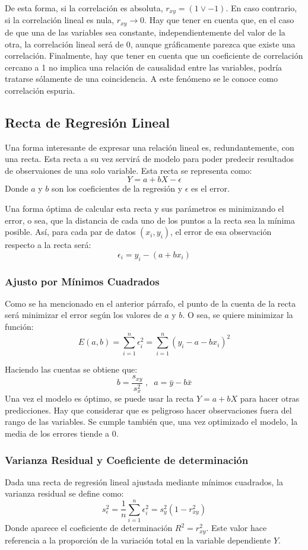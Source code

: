\documentclass[10pt,a4paper]{book}
\begin{document}
De esta forma, si la correlación es absoluta, $r_{xy} = (1 \lor -1)$. En caso contrario, si la correlación lineal es nula, $r_{xy}\to 0$. Hay que tener en cuenta que, en el caso de que una de las variables sea constante, independientemente del valor de la otra, la correlación lineal será de 0, aunque gráficamente parezca que existe una correlación. Finalmente, hay que tener en cuenta que un coeficiente de correlación cercano a 1 no implica una relación de causalidad entre las variables, podría tratarse sólamente de una coincidencia. A este fenómeno se le conoce como correlación espuria.

\subsection{Recta de Regresión Lineal}
Una forma interesante de expresar una relación lineal es, redundantemente, con una recta. Esta recta a su vez servirá de modelo para poder predecir resultados de observaiones de una solo variable. Esta recta se representa como:
\[Y=a+bX-\epsilon\]
Donde $a$ y $b$ son los coeficientes de la regresión y $\epsilon$ es el error.

Una forma óptima de calcular esta recta y sus parámetros es minimizando el error, o sea, que la distancia de cada uno de los puntos a la recta sea la mínima posible. Así, para cada par de datos $(x_i,y_i)$, el error de esa observación respecto a la recta será:
\[\epsilon_i = y_i-(a+bx_i)\]

\subsubsection{Ajusto por Mínimos Cuadrados}
Como se ha mencionado en el anterior párrafo, el punto de la cuenta de la recta será minimizar el error según los valores de $a$ y $b$. O sea, se quiere minimizar la función:
\[E(a,b) = \sum_{i=1}^n\epsilon_i^2 = \sum_{i=1}^n(y_i-a-bx_i)^2\]

Haciendo las cuentas se obtiene que:
\[b=\frac{s_{xy}}{s_x^2}\;,\;\;a = \bar{y}-b\bar{x}\]
Una vez el modelo es óptimo, se puede usar la recta $Y=a+bX$ para hacer otras predicciones. Hay que considerar que es peligroso hacer observaciones fuera del rango de las variables. Se cumple también que, una vez optimizado el modelo, la media de los errores tiende a 0. 

\subsubsection{Varianza Residual y Coeficiente de determinación}
Dada una recta de regresión lineal ajustada mediante mínimos cuadrados, la varianza residual se define como:
\[s_\epsilon^2=\frac1{n}\sum_{i=1}^n\epsilon_i^2=s_y^2(1-r_{xy}^2)\]
Donde aparece el coeficiente de determinación $R^2 = r_{xy}^2$. Este valor hace referencia a la proporción de la variación total en la variable dependiente $Y$.
\end{document}
